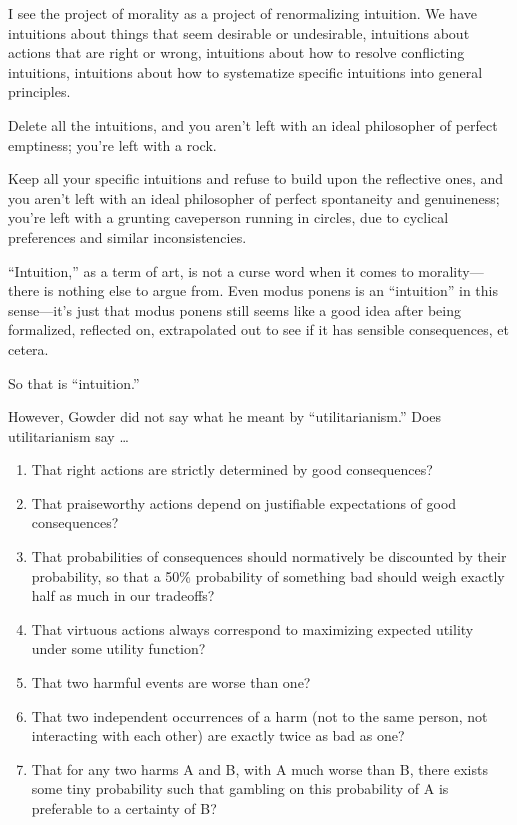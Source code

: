 {
 I see the project of morality as a project of renormalizing
intuition. We have intuitions about things that seem desirable or
undesirable, intuitions about actions that are right or wrong,
intuitions about how to resolve conflicting intuitions, intuitions
about how to systematize specific intuitions into general principles.}

{
 Delete all the intuitions, and you aren't left
with an ideal philosopher of perfect emptiness; you're
left with a rock.}

{
 Keep all your specific intuitions and refuse to build upon the
reflective ones, and you aren't left with an ideal
philosopher of perfect spontaneity and genuineness;
you're left with a grunting caveperson running in
circles, due to cyclical preferences and similar inconsistencies.}

{
 ``Intuition,'' as a term of
art, is not a curse word when it comes to morality---there is nothing
else to argue from. Even modus ponens is an
``intuition'' in this
sense---it's just that modus ponens still seems like a
good idea after being formalized, reflected on, extrapolated out to see
if it has sensible consequences, et cetera.}

{
 So that is ``intuition.''}

{
 However, Gowder did not say what he meant by
``utilitarianism.'' Does
utilitarianism say \ldots}

\begin{enumerate}
\item  That right actions are strictly determined by good consequences?
\item  That praiseworthy actions depend on justifiable expectations of
good consequences?
\item  That probabilities of consequences should normatively be
discounted by their probability, so that a 50\% probability of
something bad should weigh exactly half as much in our tradeoffs?
\item  That virtuous actions always correspond to maximizing expected
utility under some utility function?
\item  That two harmful events are worse than one?
\item  That two independent occurrences of a harm (not to the same
person, not interacting with each other) are exactly twice as bad as
one?
\item  That for any two harms A and B, with A much worse than B, there
exists some tiny probability such that gambling on this probability of
A is preferable to a certainty of B?
\end{enumerate}

